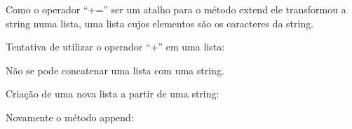 \documentclass[letterpaper,10pt,brazil]{sphinxmanual}
\begin{document}
Como o operador “+=” ser um atalho para o método extend ele transformou a
string numa lista, uma lista cujos elementos são os caracteres da string.

Tentativa de utilizar o operador “+” em uma lista:

\begin{sphinxVerbatim}[commandchars=\\\{\}]
  
\end{sphinxVerbatim}

\begin{sphinxVerbatim}[commandchars=\\\{\}]
\end{sphinxVerbatim}

Não se pode concatenar uma lista com uma string.

Criação de uma nova lista a partir de uma string:

\begin{sphinxVerbatim}[commandchars=\\\{\}]
  
\end{sphinxVerbatim}

\begin{sphinxVerbatim}[commandchars=\\\{\}]
\end{sphinxVerbatim}

Novamente o método append:

\begin{sphinxVerbatim}[commandchars=\\\{\}]
\end{sphinxVerbatim}

\begin{sphinxVerbatim}[commandchars=\\\{\}]
\end{sphinxVerbatim}
\end{document}
